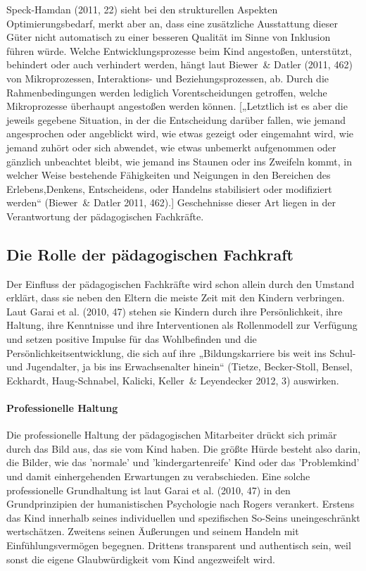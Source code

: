 Speck-Hamdan (2011, 22) sieht bei den strukturellen Aspekten Optimierungsbedarf, merkt aber an, dass eine zusätzliche Ausstattung dieser Güter nicht automatisch zu einer besseren Qualität im Sinne von Inklusion führen würde. Welche Entwicklungsprozesse beim Kind angestoßen, unterstützt, behindert oder auch verhindert werden, hängt laut Biewer~\& Datler (2011, 462) von Mikroprozessen, Interaktions- und Beziehungsprozessen, ab. Durch die Rahmenbedingungen werden lediglich Vorentscheidungen getroffen, welche Mikroprozesse überhaupt angestoßen werden können. [„Letztlich ist es aber die jeweils gegebene Situation, in der die Entscheidung darüber fallen, wie jemand angesprochen oder angeblickt wird, wie etwas gezeigt oder eingemahnt wird, wie jemand zuhört oder sich abwendet, wie etwas unbemerkt aufgenommen oder gänzlich unbeachtet bleibt, wie jemand ins Staunen oder ins Zweifeln kommt, in welcher Weise bestehende Fähigkeiten und Neigungen in den Bereichen des Erlebens,Denkens, Entscheidens, oder Handelns stabilisiert oder modifiziert werden“ (Biewer~\& Datler 2011, 462).] Geschehnisse dieser Art liegen in der Verantwortung der pädagogischen Fachkräfte. 

\subsection{Die Rolle der pädagogischen Fachkraft}

Der Einfluss der pädagogischen Fachkräfte wird schon allein durch den Umstand erklärt, dass sie neben den Eltern die meiste Zeit mit den Kindern verbringen. Laut Garai et al. (2010, 47) stehen sie Kindern durch ihre Persönlichkeit, ihre Haltung, ihre Kenntnisse und ihre Interventionen als Rollenmodell zur Verfügung und setzen positive Impulse für das Wohlbefinden und die Persönlichkeitsentwicklung, die sich auf ihre „Bildungskarriere bis weit ins Schul- und Jugendalter, ja bis ins Erwachsenalter hinein“ (Tietze, Becker-Stoll, Bensel, Eckhardt, Haug-Schnabel, Kalicki, Keller~\& Leyendecker 2012, 3) auswirken.  
 
\paragraph{Professionelle Haltung} 
Die professionelle Haltung der pädagogischen Mitarbeiter drückt sich primär durch das Bild aus, das sie vom Kind haben.
Die größte Hürde besteht also darin, die Bilder, wie das 'normale' und 'kindergartenreife' Kind oder das 'Problemkind' und damit einhergehenden Erwartungen zu verabschieden.  
Eine solche professionelle Grundhaltung ist laut Garai et al. (2010, 47) in den Grundprinzipien der humanistischen Psychologie nach Rogers verankert. Erstens das Kind innerhalb seines individuellen und spezifischen So-Seins uneingeschränkt wertschätzen. Zweitens seinen Äußerungen und seinem Handeln mit Einfühlungsvermögen begegnen. Drittens transparent und authentisch sein, weil sonst die eigene Glaubwürdigkeit vom Kind angezweifelt wird.
   
